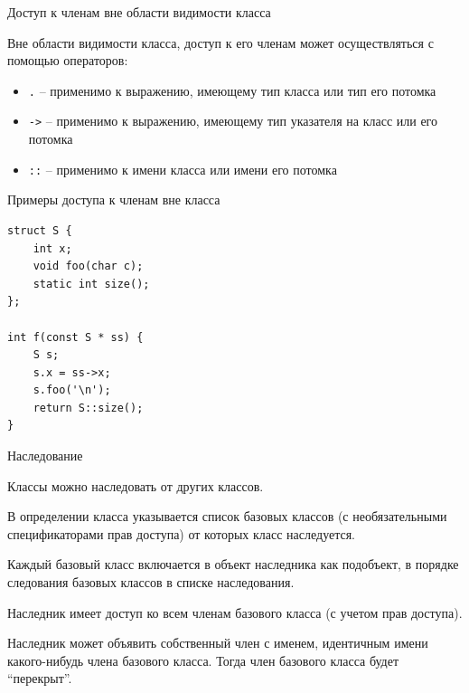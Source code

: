 \documentclass[unknownkeysallowed,xcolor=table]{beamer}
\begin{document}
\begin{frame}{Доступ к членам вне области видимости класса}

Вне области видимости класса, доступ к его членам может осуществляться с помощью операторов:

\vspace{1em}

\begin{itemize}
  \item \lstinline{.} -- применимо к выражению, имеющему тип класса или тип его потомка \vspace{0.5em}
  \item \lstinline{->} -- применимо к выражению, имеющему тип указателя на класс или его потомка \vspace{0.5em}
  \item \lstinline{::} -- применимо к имени класса или имени его потомка \vspace{0.5em}
\end{itemize}

\end{frame}

\begin{frame}[fragile]{Примеры доступа к членам вне класса}

\begin{lstlisting}
struct S {
    int x;
    void foo(char c);
    static int size();
};

int f(const S * ss) {
    S s;
    s.x = ss->x;
    s.foo('\n');
    return S::size();
}
\end{lstlisting}

\end{frame}

\begin{frame}{Наследование}

Классы можно наследовать от других классов.

\vspace{0.5em}

В определении класса указывается список базовых классов (с необязательными спецификаторами прав доступа) от которых класс наследуется.

\vspace{0.5em}

Каждый базовый класс включается в объект наследника как подобъект, в порядке следования базовых классов в списке наследования.

\vspace{0.5em}

Наследник имеет доступ ко всем членам базового класса (с учетом прав доступа).

Наследник может объявить собственный член с именем, идентичным имени какого-нибудь члена базового класса. Тогда член базового класса будет ``перекрыт''.

\end{frame}
\end{document}
